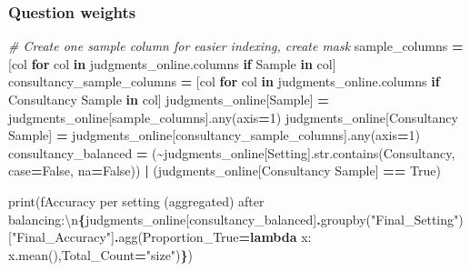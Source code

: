 \documentclass[
]{article}
\newenvironment{Shaded}{\begin{snugshade}}{\end{snugshade}}
\newcommand{\BuiltInTok}[1]{#1}
\newcommand{\CharTok}[1]{\textcolor[rgb]{0.31,0.60,0.02}{#1}}
\newcommand{\CommentTok}[1]{\textcolor[rgb]{0.56,0.35,0.01}{\textit{#1}}}
\newcommand{\ControlFlowTok}[1]{\textcolor[rgb]{0.13,0.29,0.53}{\textbf{#1}}}
\newcommand{\DecValTok}[1]{\textcolor[rgb]{0.00,0.00,0.81}{#1}}
\newcommand{\KeywordTok}[1]{\textcolor[rgb]{0.13,0.29,0.53}{\textbf{#1}}}
\newcommand{\NormalTok}[1]{#1}
\newcommand{\OperatorTok}[1]{\textcolor[rgb]{0.81,0.36,0.00}{\textbf{#1}}}
\newcommand{\SpecialCharTok}[1]{\textcolor[rgb]{0.81,0.36,0.00}{\textbf{#1}}}
\newcommand{\SpecialStringTok}[1]{\textcolor[rgb]{0.31,0.60,0.02}{#1}}
\newcommand{\StringTok}[1]{\textcolor[rgb]{0.31,0.60,0.02}{#1}}
\newcommand{\VariableTok}[1]{\textcolor[rgb]{0.00,0.00,0.00}{#1}}
\begin{document}
\subsubsection{Question weights}\label{question-weights}

\begin{Shaded}
\begin{Highlighting}[]
\CommentTok{\# Create one sample column for easier indexing, create mask}
\NormalTok{sample\_columns }\OperatorTok{=}\NormalTok{ [col }\ControlFlowTok{for}\NormalTok{ col }\KeywordTok{in}\NormalTok{ judgments\_online.columns }\ControlFlowTok{if} \StringTok{\textquotesingle{}Sample\textquotesingle{}} \KeywordTok{in}\NormalTok{ col]}
\NormalTok{consultancy\_sample\_columns }\OperatorTok{=}\NormalTok{ [col }\ControlFlowTok{for}\NormalTok{ col }\KeywordTok{in}\NormalTok{ judgments\_online.columns }\ControlFlowTok{if} \StringTok{\textquotesingle{}Consultancy Sample\textquotesingle{}} \KeywordTok{in}\NormalTok{ col]}
\NormalTok{judgments\_online[}\StringTok{\textquotesingle{}Sample\textquotesingle{}}\NormalTok{] }\OperatorTok{=}\NormalTok{ judgments\_online[sample\_columns].}\BuiltInTok{any}\NormalTok{(axis}\OperatorTok{=}\DecValTok{1}\NormalTok{)}
\NormalTok{judgments\_online[}\StringTok{\textquotesingle{}Consultancy Sample\textquotesingle{}}\NormalTok{] }\OperatorTok{=}\NormalTok{ judgments\_online[consultancy\_sample\_columns].}\BuiltInTok{any}\NormalTok{(axis}\OperatorTok{=}\DecValTok{1}\NormalTok{)}
\NormalTok{consultancy\_balanced }\OperatorTok{=}\NormalTok{ (}\OperatorTok{\textasciitilde{}}\NormalTok{judgments\_online[}\StringTok{\textquotesingle{}Setting\textquotesingle{}}\NormalTok{].}\BuiltInTok{str}\NormalTok{.contains(}\StringTok{\textquotesingle{}Consultancy\textquotesingle{}}\NormalTok{, case}\OperatorTok{=}\VariableTok{False}\NormalTok{, na}\OperatorTok{=}\VariableTok{False}\NormalTok{)) }\OperatorTok{|}\NormalTok{ (judgments\_online[}\StringTok{\textquotesingle{}Consultancy Sample\textquotesingle{}}\NormalTok{] }\OperatorTok{==} \VariableTok{True}\NormalTok{)}

\BuiltInTok{print}\NormalTok{(}\SpecialStringTok{f\textquotesingle{}Accuracy per setting (aggregated) after balancing:}\CharTok{\textbackslash{}n}\SpecialCharTok{\{}\NormalTok{judgments\_online[consultancy\_balanced]}\SpecialCharTok{.}\NormalTok{groupby(}\StringTok{"Final\_Setting"}\NormalTok{)[}\StringTok{"Final\_Accuracy"}\NormalTok{]}\SpecialCharTok{.}\NormalTok{agg(Proportion\_True}\OperatorTok{=}\KeywordTok{lambda}\NormalTok{ x: x.mean(),Total\_Count}\OperatorTok{=}\StringTok{"size"}\NormalTok{)}\SpecialCharTok{\}}\SpecialStringTok{\textquotesingle{}}\NormalTok{)}
\end{Highlighting}
\end{Shaded}
\end{document}
